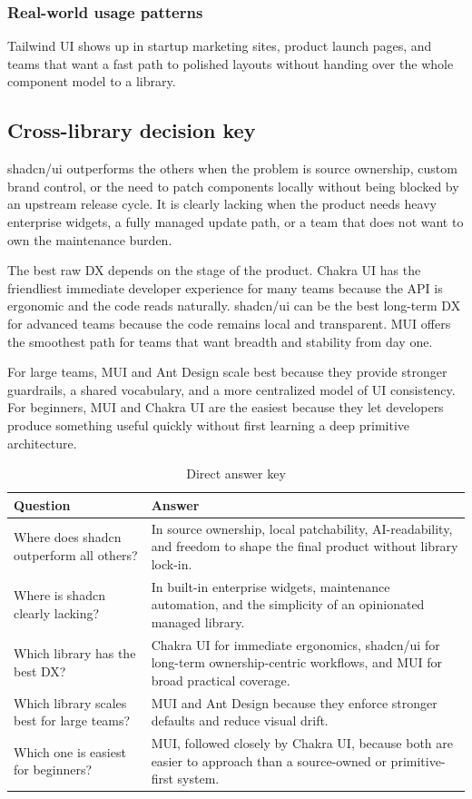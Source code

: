 \documentclass[11pt,twoside,a4paper]{article}
\begin{document}
\subsubsection{Real-world usage patterns}
Tailwind UI shows up in startup marketing sites, product launch pages, and teams that want a fast path to polished layouts without handing over the whole component model to a library.

\subsection{Cross-library decision key}
shadcn/ui outperforms the others when the problem is source ownership, custom brand control, or the need to patch components locally without being blocked by an upstream release cycle. It is clearly lacking when the product needs heavy enterprise widgets, a fully managed update path, or a team that does not want to own the maintenance burden.

The best raw DX depends on the stage of the product. Chakra UI has the friendliest immediate developer experience for many teams because the API is ergonomic and the code reads naturally. shadcn/ui can be the best long-term DX for advanced teams because the code remains local and transparent. MUI offers the smoothest path for teams that want breadth and stability from day one.

For large teams, MUI and Ant Design scale best because they provide stronger guardrails, a shared vocabulary, and a more centralized model of UI consistency. For beginners, MUI and Chakra UI are the easiest because they let developers produce something useful quickly without first learning a deep primitive architecture.

\begin{table}[htbp]
  \centering
  \caption{Direct answer key}
  \begin{tabularx}{\textwidth}{@{}p{}Y@{}}
    \toprule
    \textbf{Question} & \textbf{Answer} \\
    \midrule
    Where does shadcn outperform all others? & In source ownership, local patchability, AI-readability, and freedom to shape the final product without library lock-in. \\
    Where is shadcn clearly lacking? & In built-in enterprise widgets, maintenance automation, and the simplicity of an opinionated managed library. \\
    Which library has the best DX? & Chakra UI for immediate ergonomics, shadcn/ui for long-term ownership-centric workflows, and MUI for broad practical coverage. \\
    Which library scales best for large teams? & MUI and Ant Design because they enforce stronger defaults and reduce visual drift. \\
    Which one is easiest for beginners? & MUI, followed closely by Chakra UI, because both are easier to approach than a source-owned or primitive-first system. \\
    \bottomrule
  \end{tabularx}
\end{table}
\end{document}

